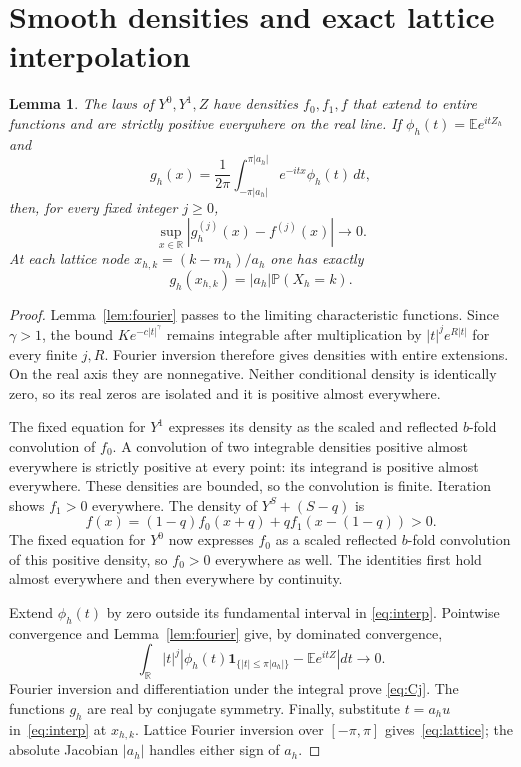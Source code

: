 \documentclass[11pt]{article}
\newtheorem{lemma}[theorem]{Lemma}
\newcommand{\E}{\mathbb E}
\newcommand{\Pp}{\mathbb P}
\begin{document}
\section{Smooth densities and exact lattice interpolation}
\begin{lemma}\label{lem:densities}
The laws of $Y^0,Y^1,Z$ have densities $f_0,f_1,f$ that extend to entire
functions and are strictly positive everywhere on the real line.
If $\phi_h(t)=\E e^{itZ_h}$ and
\begin{equation}\label{eq:interp}
 g_h(x)=\frac1{2\pi}\int_{-\pi|a_h|}^{\pi|a_h|}
                 e^{-itx}\phi_h(t)\,dt,
\end{equation}
then, for every fixed integer $j\ge0$,
\begin{equation}\label{eq:Cj}
 \sup_{x\in\mathbb R}|g_h^{(j)}(x)-f^{(j)}(x)|\longrightarrow0.
\end{equation}
At each lattice node $x_{h,k}=(k-m_h)/a_h$ one has exactly
\begin{equation}\label{eq:lattice}
 g_h(x_{h,k})=|a_h|\Pp(X_h=k).
\end{equation}
\end{lemma}
\begin{proof}
Lemma~\ref{lem:fourier} passes to the limiting characteristic functions.
Since $\gamma>1$, the bound $Ke^{-c|t|^\gamma}$ remains integrable after
multiplication by $|t|^j e^{R|t|}$ for every finite $j,R$. Fourier
inversion therefore gives densities with entire extensions. On the real
axis they are nonnegative. Neither conditional density is identically
zero, so its real zeros are isolated and it is positive almost everywhere.

The fixed equation for $Y^1$ expresses its density as the scaled and
reflected $b$-fold convolution of $f_0$. A convolution of two integrable
densities positive almost everywhere is strictly positive at every point:
its integrand is positive almost everywhere. These densities are bounded,
so the convolution is finite. Iteration shows $f_1>0$ everywhere.
The density of $Y^S+(S-q)$ is
\[
 f(x)=(1-q)f_0(x+q)+qf_1(x-(1-q))>0.
\]
The fixed equation for $Y^0$ now expresses $f_0$ as a scaled reflected
$b$-fold convolution of this positive density, so $f_0>0$ everywhere as
well. The identities first hold almost everywhere and then everywhere by
continuity.

Extend $\phi_h(t)$ by zero outside its fundamental interval in
\eqref{eq:interp}. Pointwise convergence and Lemma~\ref{lem:fourier}
give, by dominated convergence,
\[
 \int_{\mathbb R}|t|^j
 \left|\phi_h(t)\boldsymbol1_{\{|t|\le\pi|a_h|\}}-\E e^{itZ}\right|dt
 \longrightarrow0.
\]
Fourier inversion and differentiation under the integral prove
\eqref{eq:Cj}. The functions $g_h$ are real by conjugate symmetry.
Finally, substitute $t=a_hu$ in~\eqref{eq:interp} at $x_{h,k}$.
Lattice Fourier inversion over $[-\pi,\pi]$ gives~\eqref{eq:lattice};
the absolute Jacobian $|a_h|$ handles either sign of $a_h$.
\end{proof}
\end{document}

